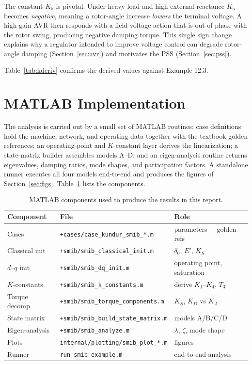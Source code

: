 \documentclass[12pt,a4paper]{article}
\begin{document}
The constant $K_5$ is pivotal. Under heavy load and high external reactance
$K_5$ becomes \emph{negative}, meaning a rotor-angle increase \emph{lowers} the
terminal voltage. A high-gain AVR then responds with a field-voltage action that
is out of phase with the rotor swing, producing negative damping torque. This
single sign change explains why a regulator intended to improve voltage control
can degrade rotor-angle damping (Section~\ref{sec:avr}) and motivates the PSS
(Section~\ref{sec:pss}).

Table~\ref{tab:kderiv} confirms the derived values against Example 12.3.

\section{MATLAB Implementation}
\label{sec:impl}

The analysis is carried out by a small set of MATLAB routines: case definitions
hold the machine, network, and operating data together with the textbook golden
references; an operating-point and $K$-constant layer derives the linearization;
a state-matrix builder assembles models A--D; and an eigen-analysis routine
returns eigenvalues, damping ratios, mode shapes, and participation factors. A
standalone runner executes all four models end-to-end and produces the figures
of Section~\ref{sec:figs}. Table~\ref{tab:impl} lists the components.

\begin{table}[H]
\centering
\caption{MATLAB components used to produce the results in this report.}
\label{tab:impl}
\begin{tabular}{@{}lll@{}}
\toprule
Component & File & Role \\
\midrule
Cases          & \texttt{+cases/case\_kundur\_smib\_*.m} & parameters + golden refs \\
Classical init & \texttt{+smib/smib\_classical\_init.m}  & $\delta_0$, $E'$, $K_S$ \\
$d$--$q$ init  & \texttt{+smib/smib\_dq\_init.m}         & operating point, saturation \\
$K$-constants  & \texttt{+smib/smib\_k\_constants.m}     & derive $K_1$--$K_4$, $T_3$ \\
Torque decomp. & \texttt{+smib/smib\_torque\_components.m} & $K_S$, $K_D$ vs $K_A$ \\
State matrix   & \texttt{+smib/smib\_build\_state\_matrix.m} & models A/B/C/D \\
Eigen-analysis & \texttt{+smib/smib\_analyze.m}          & $\lambda$, $\zeta$, mode shape \\
Plots          & \texttt{internal/plotting/smib\_plot\_*.m} & figures \\
Runner         & \texttt{run\_smib\_example.m}           & end-to-end analysis \\
\bottomrule
\end{tabular}
\end{table}
\end{document}
